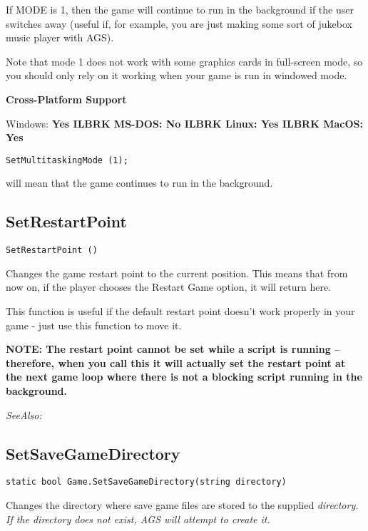If MODE is 1, then the game will continue to run in the background if the user
switches away (useful if, for example, you are just making some sort of jukebox
music player with AGS).

Note that mode 1 does not work with some graphics cards in full-screen mode, so you
should only rely on it working when your game is run in windowed mode.

\bf{Cross-Platform Support}

Windows: \bf{ Yes }ILBRK
MS-DOS: \bf{ No }ILBRK
Linux: \bf{ Yes }ILBRK
MacOS: \bf{ Yes }


\begin{verbatim}
SetMultitaskingMode (1);
\end{verbatim}
will mean that the game continues to run in the background.


\subsection{SetRestartPoint}\label{SetRestartPoint}%

\begin{verbatim}
SetRestartPoint ()
\end{verbatim}
Changes the game restart point to the current position. This means that
from now on, if the player chooses the Restart Game option, it will return
here.

This function is useful if the default restart point doesn't work properly
in your game - just use this function to move it.

\bf{NOTE:} The restart point cannot be set while a script is running -- therefore,
when you call this it will actually set the restart point at the next game
loop where there is not a blocking script running in the background.

\it{SeeAlso:} 


\subsection{SetSaveGameDirectory}\label{Game.SetSaveGameDirectory}%

\begin{verbatim}
static bool Game.SetSaveGameDirectory(string directory)
\end{verbatim}
Changes the directory where save game files are stored to the supplied \it{directory}.
If the directory does not exist, AGS will attempt to create it.

